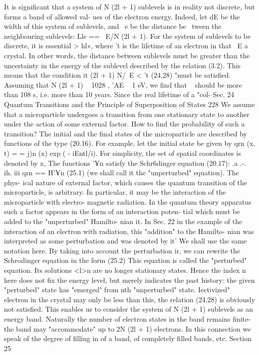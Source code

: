 \documentclass[a4paper,sfsidenotes,colorlinks=true]{tufte-book}
\numberwithin{equation}{section}
\numberwithin{figure}{section}
\begin{document}
{{{{{It is significant that a system of N (2l + 1) sublevels is in reality not discrete, but forms a band of allowed val- ues of the electron energy. Indeed, let dE be the width of this system of sublevels, and ~e be the distance be~ tween the neighbouring sublevels: Lle == ~E/N (2l + 1). For the system of sublevels to be discrete, it is essential
> hl«, where 't is the lifetime of an electron in
that ~E a crystal. In other words, the distance between sublevels must be greater than the uncertainty in the energy of the sublevel described by the relation (3.2). This means that the condition
it (2l + 1) N/~E < 't	(24.28)
"must be satisfied. Assuming that N (2l + 1) ~ 1028 , 'AE ~ 1 eV, we find that ~ should be more than 108 s, i.e. more than 10 years. Since the real lifetime of a "col-
Sec. 24
Quantum Transitions and the Principle of Superposition of States
228
We assume that a microparticle undergoes a transition from one stationary state to another under the action of some external factor. How to find the probability of such a transition?
The initial and the final states of the microparticle are described by functions of the type (20.16). For example, let the initial state be given by qrn (x, t) =
=	{j)n (x) exp ( - iEntl/i). For simplicity, the set of spatial coordinates is denoted by x, The functions '¥n satisfy the Schr6dinger equation (20.17):
.a .-. ih. iii qrn == H'¥n	(25.1)
(we shall call it the "unperturbed" equation). The phys- ical nature of external factor, which causes the quantum transition of the microparticle, is arbitrary. In particular, it may be the interaction of the microparticle with electro- magnetic radiation. In the quantum theory apparatus such a factor appears in the form of an interaction poten- tial which must be added to the "unperturbed" Hamilto-
nian it. In Sec. 22 in the example of the interaction of an electron with radiation, this "addition" to the Hamilto- nian was interpreted as some perturbation and was denoted
by it' We shall use the same notation here. By taking into account the perturbation ir, we can rewrite the
Schrodinger equation in the form
(25.2)
This equation is called the "perturbed" equation. Its solutions <l>n are no longer stationary states. Hence the index n here does not fix the energy level, but merely indicates the past history: the given "perturbed" state
has "emerged" from nth "unperturbed" state.
Iectivized" electron in the crystal may only be less than this, the relation (24.28) is obviously not satisfied. This enables us to consider the system of N (2l + 1) sublevels as an energy band. Naturally the number of electron states in	the band remains finite-the band may "accommodate" up to 2N (2l + 1) electrons. In this connection we speak of the degree of filling in of a band, of completely filled bands, etc.
Section 25
}}}}}}
\end{document}
